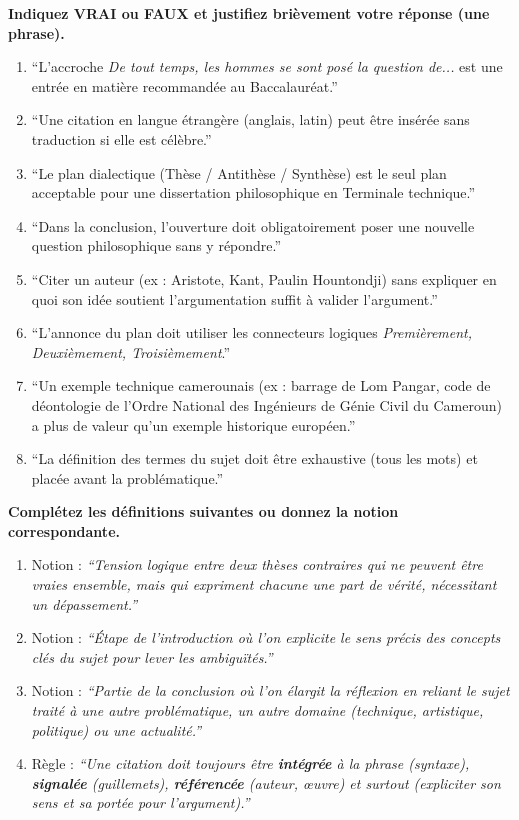 \documentclass[11pt]{article}
\begin{document}
\begin{exercice}
\textbf{Indiquez VRAI ou FAUX et justifiez brièvement votre réponse (une phrase).}
\begin{enumerate}
    \item ``L'accroche \emph{De tout temps, les hommes se sont posé la question de...} est une entrée en matière recommandée au Baccalauréat.''
    \item ``Une citation en langue étrangère (anglais, latin) peut être insérée sans traduction si elle est célèbre.''
    \item ``Le plan dialectique (Thèse / Antithèse / Synthèse) est le seul plan acceptable pour une dissertation philosophique en Terminale technique.''
    \item ``Dans la conclusion, l'ouverture doit obligatoirement poser une nouvelle question philosophique sans y répondre.''
    \item ``Citer un auteur (ex : Aristote, Kant, Paulin Hountondji) sans expliquer en quoi son idée soutient l'argumentation suffit à valider l'argument.''
    \item ``L'annonce du plan doit utiliser les connecteurs logiques \emph{Premièrement, Deuxièmement, Troisièmement}.''
    \item ``Un exemple technique camerounais (ex : barrage de Lom Pangar, code de déontologie de l'Ordre National des Ingénieurs de Génie Civil du Cameroun) a plus de valeur qu'un exemple historique européen.''
    \item ``La définition des termes du sujet doit être exhaustive (tous les mots) et placée avant la problématique.''
\end{enumerate}
\end{exercice}

\begin{exercice}
\textbf{Complétez les définitions suivantes ou donnez la notion correspondante.}
\begin{enumerate}
    \item Notion : \emph{``Tension logique entre deux thèses contraires qui ne peuvent être vraies ensemble, mais qui expriment chacune une part de vérité, nécessitant un dépassement.''} \rightarrow \dotfill
    \item Notion : \emph{``Étape de l'introduction où l'on explicite le sens précis des concepts clés du sujet pour lever les ambiguïtés.''} \rightarrow \dotfill
    \item Notion : \emph{``Partie de la conclusion où l'on élargit la réflexion en reliant le sujet traité à une autre problématique, un autre domaine (technique, artistique, politique) ou une actualité.''} \rightarrow \dotfill
    \item Règle : \emph{``Une citation doit toujours être \textbf{intégrée} à la phrase (syntaxe), \textbf{signalée} (guillemets), \textbf{référencée} (auteur, œuvre) et surtout \textbf{\dotfill} (expliciter son sens et sa portée pour l'argument).''}
\end{enumerate}
\end{exercice}
\end{document}

